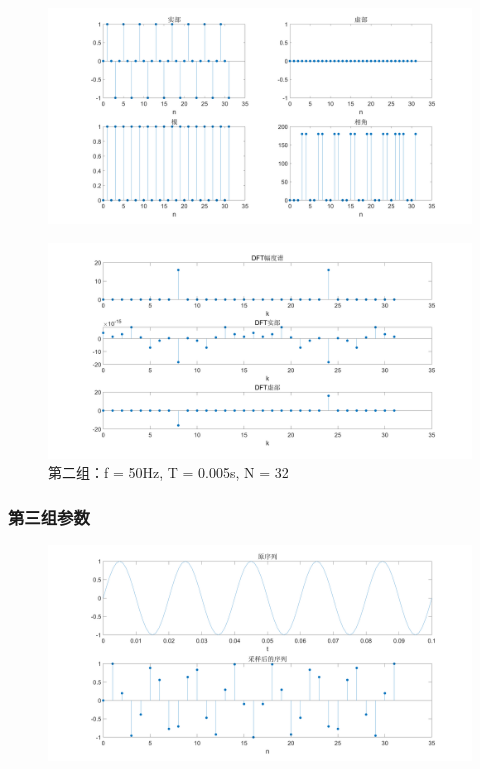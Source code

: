\documentclass{../source/Experiment copy}
\begin{document}
                \begin{figure}[H]
                    \centering
                    \includegraphics[width = \textwidth]{src/exp2_2_2.png}
                \end{figure}

                \begin{figure}[H]
                    \centering
                    \includegraphics[width = \textwidth]{src/exp2_2_3.png}
                    \caption{第二组：f = 50Hz, T = 0.005s, N = 32}
                \end{figure}

            \subsubsection{第三组参数}
                \begin{figure}[H]
                    \centering
                    \includegraphics[width = \textwidth]{src/exp2_3_1.png}
                \end{figure}
\end{document}
